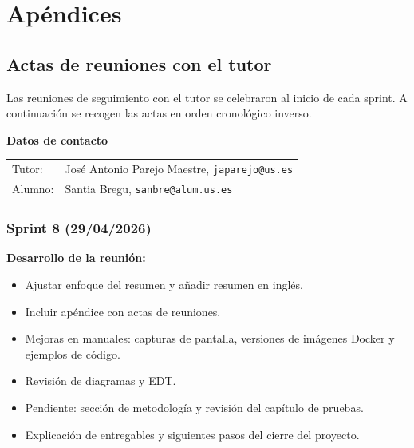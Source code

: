 

\appendix
\chapter{Apéndices}\label{cap:apendices}

\section{Actas de reuniones con el tutor}\label{ap:actas}

Las reuniones de seguimiento con el tutor se celebraron al inicio de cada sprint. A continuación se recogen las actas en orden cronológico inverso.

\noindent\textbf{Datos de contacto}

\begin{tabular}{ll}
Tutor: & José Antonio Parejo Maestre, \texttt{japarejo@us.es} \\
Alumno: & Santia Bregu, \texttt{sanbre@alum.us.es} \\
\end{tabular}

\subsection*{Sprint 8 (29/04/2026)}

\textbf{Desarrollo de la reunión:}
\begin{itemize}
  \item Ajustar enfoque del resumen y añadir resumen en inglés.
  \item Incluir apéndice con actas de reuniones.
  \item Mejoras en manuales: capturas de pantalla, versiones de imágenes Docker y ejemplos de código.
  \item Revisión de diagramas y EDT.
  \item Pendiente: sección de metodología y revisión del capítulo de pruebas.
  \item Explicación de entregables y siguientes pasos del cierre del proyecto.
\end{itemize}

